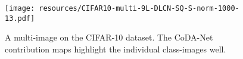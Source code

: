 \begin{figure}
    \centering
    {
    \centering
    \texttt{[image: resources/CIFAR10-multi-9L-DLCN-SQ-S-norm-1000-13.pdf]}
    }
    \caption{\small A multi-image on the CIFAR-10 dataset. The CoDA-Net contribution maps highlight the individual class-images well.}
    \label{fig:multi_image}
\end{figure}